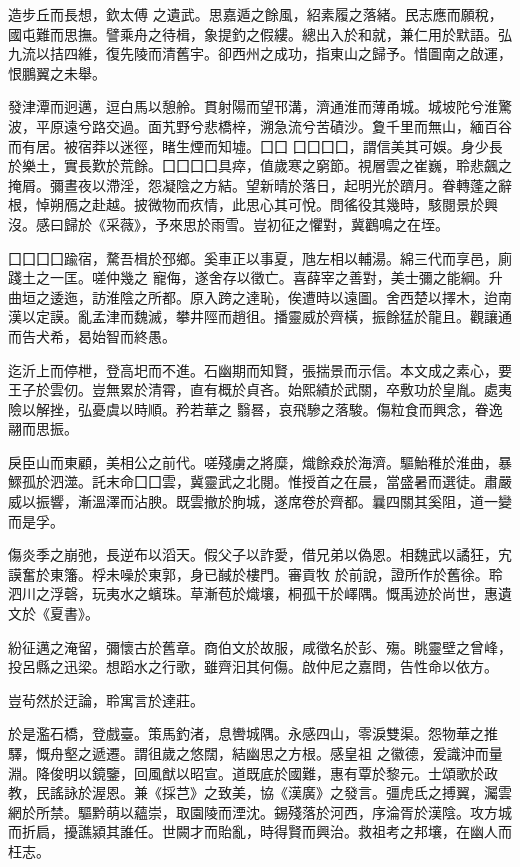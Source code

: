 \begin{pinyinscope}
 造步丘而長想，欽太傅
 之遺武。思嘉遁之餘風，紹素履之落緒。民志應而願稅，國屯難而思撫。譬乘舟之待楫，象提釣之假縷。總出入於和就，兼仁用於默語。弘九流以拮四維，復先陵而清舊宇。卻西州之成功，指東山之歸予。惜圖南之啟運，恨鵬翼之未舉。



 發津潭而迥邁，逗白馬以憩舲。貫射陽而望邗溝，濟通淮而薄甬城。城坡陀兮淮驚波，平原遠兮路交過。面艽野兮悲橋梓，溯急流兮苦磧沙。夐千里而無山，緬百谷而有居。被宿莽以迷徑，睹生煙而知墟。囗囗
 囗囗囗囗，謂信美其可娛。身少長於樂土，實長歎於荒餘。囗囗囗囗具瘁，值歲寒之窮節。視層雲之崔巍，聆悲飆之掩屑。彌晝夜以滯淫，怨凝陰之方結。望新晴於落日，起明光於躋月。眷轉蓬之辭根，悼朔鴈之赴越。披微物而疚情，此思心其可悅。問徭役其幾時，駭閱景於興沒。感曰歸於《采薇》，予來思於雨雪。豈初征之懼對，冀鸛鳴之在垤。



 囗囗囗囗踰宿，騖吾楫於邳鄉。奚車正以事夏，虺左相以輔湯。綿三代而享邑，廁踐土之一匡。嗟仲幾之
 寵侮，遂舍存以徵亡。喜薛宰之善對，美士彌之能綱。升曲垣之逶迤，訪淮陰之所都。原入跨之達恥，俟遭時以遠圖。舍西楚以擇木，迨南漢以定謨。亂孟津而魏滅，攀井陘而趙徂。播靈威於齊橫，振餘猛於龍且。觀讓通而告犬希，曷始智而終愚。



 迄沂上而停枻，登高圯而不進。石幽期而知賢，張揣景而示信。本文成之素心，要王子於雲仞。豈無累於清霄，直有概於貞吝。始熙績於武關，卒敷功於皇胤。處夷險以解挫，弘憂虞以時順。矜若華之
 翳晷，哀飛驂之落駿。傷粒食而興念，眷逸翮而思振。



 戾臣山而東顧，美相公之前代。嗟殘虜之將糜，熾餘猋於海濟。驅鮐稚於淮曲，暴鰥孤於泗澨。託末命囗囗雲，冀靈武之北閱。惟授首之在晨，當盛暑而選徒。肅嚴威以振響，漸溫澤而沾腴。既雲撤於朐城，遂席卷於齊都。曩四關其奚阻，道一變而是孚。



 傷炎季之崩弛，長逆布以滔天。假父子以詐愛，借兄弟以偽恩。相魏武以譎狂，宄謨奮於東籓。桴未噪於東郭，身已馘於樓門。審貢牧
 於前說，證所作於舊徐。聆泗川之浮磬，玩夷水之蠙珠。草漸苞於熾壤，桐孤干於嶧隅。慨禹迹於尚世，惠遺文於《夏書》。



 紛征邁之淹留，彌懷古於舊章。商伯文於故服，咸徵名於彭、殤。眺靈壁之曾峰，投呂縣之迅梁。想蹈水之行歌，雖齊汩其何傷。啟仲尼之嘉問，告性命以依方。



 豈茍然於迂論，聆寓言於達莊。



 於是濫石橋，登戲臺。策馬釣渚，息轡城隅。永感四山，零淚雙渠。怨物華之推驛，慨舟壑之遞遷。謂徂歲之悠闊，結幽思之方根。感皇祖
 之徽德，爰識沖而量淵。降俊明以鏡鑒，回風猷以昭宣。道既底於國難，惠有覃於黎元。士頌歌於政教，民謠詠於渥恩。兼《採芑》之致美，協《漢廣》之發言。彊虎氐之搏翼，灟雲網於所禁。驅黔萌以蘊崇，取園陵而湮沈。錫殘落於河西，序淪胥於漢陰。攻方城而折扃，擾譙潁其誰任。世闕才而貽亂，時得賢而興治。救祖考之邦壤，在幽人而枉志。




\end{pinyinscope}
